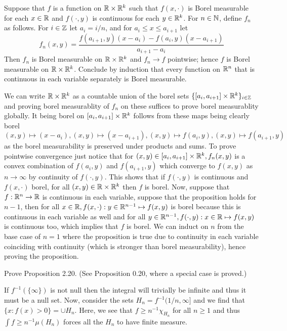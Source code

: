 \documentclass[12pt,a4paper]{article}
\begin{document}
\begin{problem}\label{prob:2-11}
Suppose that $f$ is a function on $\mathbb{R} \times \mathbb{R}^k$ such that $f(x, \cdot)$ is Borel measurable for each $x \in \mathbb{R}$ and $f(\cdot, y)$ is continuous for each $y \in \mathbb{R}^k$. For $n \in \mathbb{N}$, define $f_n$ as follows. For $i \in \mathbb{Z}$ let $a_i = i/n$, and for $a_i \le x \le a_{i+1}$ let
\[ f_n(x, y) = \frac{f(a_{i+1}, y)(x - a_i) - f(a_i, y)(x - a_{i+1})}{a_{i+1} - a_i} \]
Then $f_n$ is Borel measurable on $\mathbb{R} \times \mathbb{R}^k$ and $f_n \to f$ pointwise; hence $f$ is Borel measurable on $\mathbb{R} \times \mathbb{R}^k$. Conclude by induction that every function on $\mathbb{R}^n$ that is continuous in each variable separately is Borel measurable.
\end{problem}
\begin{solution}
    We can write $\mathbb{R}\times\mathbb{R}^k$ as a countable union of the borel sets $\{[a_i,a_{i+1}]\times\mathbb{R}^k\}_{i\in\mathbb{Z}}$ and proving borel measurablity of $f_n$ on these suffices to prove borel measurablity globally. 
    It being borel on $[a_i,a_{i+1}]\times\mathbb{R}^k$ follows from these maps being clearly borel 
    $$(x,y)\mapsto (x-a_i),(x,y)\mapsto (x-a_{i+1}),(x,y)\mapsto f(a_i,y),(x,y)\mapsto f(a_{i+1},y)$$ 
    as the borel measurability is preserved under products and sums. 
    To prove pointwise convergence just notice that for $(x,y)\in[a_i,a_{i+1}]\times\mathbb{R}^k,f_n(x,y)$ is a convex combination of $f(a_i,y)$ and $f(a_{i+1},y)$ which converge to $f(x,y)$ as $n\to\infty$ by continuity of $f(\cdot,y)$. 
    This shows that if $f(\cdot,y)$ is continuous and $f(x,\cdot)$ borel, for all $(x,y)\in\mathbb{R}\times\mathbb{R}^k$ then $f$ is borel. 
    Now, suppose that $f:\mathbb{R}^n\to\mathbb{R}$ is continuous in each variable, suppose that the proposition holds for $n-1$, then for all $x\in\mathbb{R},f(x,\cdot):y\in\mathbb{R}^{n-1}\mapsto f(x,y)$ is borel because this is continuous in each variable as well and for all $y\in\mathbb{R}^{n-1},f(\cdot,y):x\in\mathbb{R}\mapsto f(x,y)$ is continuous too, which implies that $f$ is borel. 
    We can induct on $n$ from the base case of $n=1$ where the proposition is true due to continuity in each variable coinciding with continuity (which is stronger than borel measurability), hence proving the proposition. 
\end{solution}
\begin{problem}\label{prob:2-12}
Prove Proposition 2.20. (See Proposition 0.20, where a special case is proved.)
\end{problem}
\begin{solution}
    If $f^{-1}(\{\infty\})$ is not null then the integral will trivially be infinite and thus it must be a null set. 
    Now, consider the sets $H_n=f^{-1}(1/n,\infty]$ and we find that $\{x:f(x)>0\}=\cup H_n$. 
    Here, we see that $f\geq n^{-1}\chi_{H_n}$ for all $n\geq 1$ and thus $\int f\geq n^{-1}\mu(H_n)$ forces all the $H_n$ to have finite measure. 
\end{solution}
\end{document}
